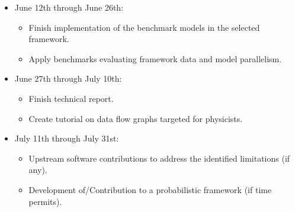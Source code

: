 \begin{itemize}
\begin{itemize}
	      \end{itemize}
	\item June 12th through June 26th:
	      \begin{itemize}
	      	\item [\uncheckedBox] Finish implementation of the benchmark models in the selected framework.
	      	\item [\uncheckedBox] Apply benchmarks evaluating framework data and model parallelism.
	      \end{itemize}
	\item June 27th through July 10th:
	      \begin{itemize}
	      	\item [\uncheckedBox] Finish technical report.
	      	\item [\uncheckedBox] Create tutorial on data flow graphs targeted for physicists.
	      \end{itemize}
	\item July 11th through July 31st:
	      \begin{itemize}
	      	\item [\uncheckedBox] Upstream software contributions to address the identified limitations (if any).
	      	\item [\uncheckedBox] Development of/Contribution to a probabilistic framework (if time permits).
	      \end{itemize}
\end{itemize}

